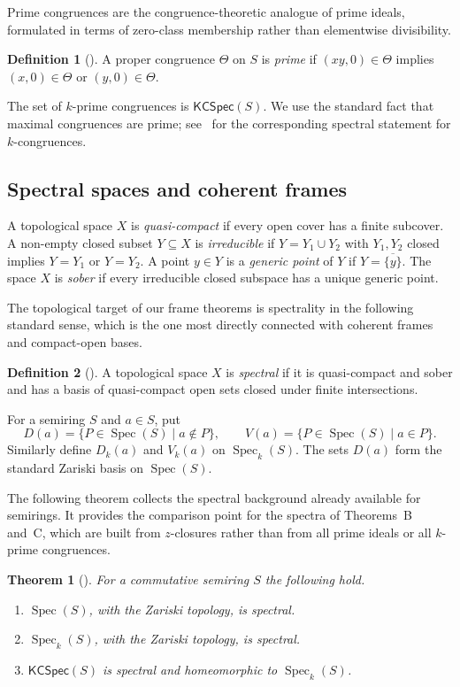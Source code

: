 \documentclass[11pt,leqno]{amsart}
\theoremstyle{plain}
\newtheorem{theorem}{Theorem}[section]
\theoremstyle{definition}
\newtheorem{definition}{Definition}[section]
\theoremstyle{remark}
\numberwithin{equation}{section}
\DeclareMathOperator{\Spec}{Spec}
\newcommand{\KCSpec}{\mathsf{KCSpec}}
\begin{document}
Prime congruences are the congruence-theoretic analogue of prime ideals,
formulated in terms of zero-class membership rather than elementwise
divisibility.

\begin{definition}[\cite{Han-k-congruence}]
A proper congruence $\Theta$ on $S$ is \emph{prime} if
$(xy,0)\in\Theta$ implies $(x,0)\in\Theta$ or $(y,0)\in\Theta$.
\end{definition}

The set of $k$-prime congruences is $\KCSpec(S)$.
We use the standard fact that maximal congruences are prime;
see~\cite[Theorem~5.5]{Han-k-congruence} for the corresponding
spectral statement for $k$-congruences.

\subsection{Spectral spaces and coherent frames}

A topological space $X$ is \emph{quasi-compact} if every open cover
has a finite subcover.
A non-empty closed subset $Y\subseteq X$ is \emph{irreducible} if
$Y=Y_1\cup Y_2$ with $Y_1,Y_2$ closed implies $Y=Y_1$ or $Y=Y_2$.
A point $y\in Y$ is a \emph{generic point} of $Y$ if
$Y=\overline{\{y\}}$.
The space $X$ is \emph{sober} if every irreducible closed subspace
has a unique generic point.

The topological target of our frame theorems is spectrality
in the following standard sense, which is the one most directly
connected with coherent frames and compact-open bases.

\begin{definition}[\cite{spectral-book,Hochster}]
A topological space $X$ is \emph{spectral} if it is quasi-compact
and sober and has a basis of quasi-compact open sets closed under
finite intersections.
\end{definition}

For a semiring $S$ and $a\in S$, put
\[
D(a)=\{P\in\Spec(S)\mid a\notin P\},\qquad
V(a)=\{P\in\Spec(S)\mid a\in P\}.
\]
Similarly define $D_k(a)$ and $V_k(a)$ on $\Spec_k(S)$.
The sets $D(a)$ form the standard Zariski basis on $\Spec(S)$.

The following theorem collects the spectral background already
available for semirings.
It provides the comparison point for the spectra of Theorems~B
and~C, which are built from $z$-closures rather than from
all prime ideals or all $k$-prime congruences.

\begin{theorem}[\cite{Pena,Han-k-congruence}]\label{thm:standard-spectral}
For a commutative semiring $S$ the following hold.
\begin{enumerate}
\item $\Spec(S)$, with the Zariski topology, is spectral.
\item $\Spec_k(S)$, with the Zariski topology, is spectral.
\item $\KCSpec(S)$ is spectral and homeomorphic to $\Spec_k(S)$.
\end{enumerate}
\end{theorem}
\end{document}
